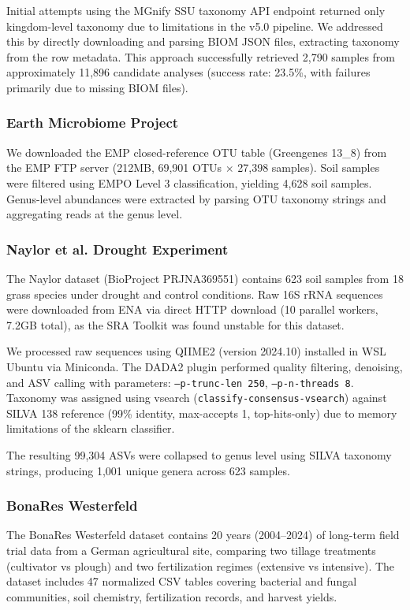 \documentclass[11pt,a4paper]{article}
\begin{document}
Initial attempts using the MGnify SSU taxonomy API endpoint returned only kingdom-level taxonomy due to limitations in the v5.0 pipeline. We addressed this by directly downloading and parsing BIOM JSON files, extracting taxonomy from the row metadata. This approach successfully retrieved 2,790 samples from approximately 11,896 candidate analyses (success rate: 23.5\%, with failures primarily due to missing BIOM files).

\subsubsection{Earth Microbiome Project}

We downloaded the EMP closed-reference OTU table (Greengenes 13\_8) from the EMP FTP server (212MB, 69,901 OTUs $\times$ 27,398 samples). Soil samples were filtered using EMPO Level 3 classification, yielding 4,628 soil samples. Genus-level abundances were extracted by parsing OTU taxonomy strings and aggregating reads at the genus level.

\subsubsection{Naylor et al. Drought Experiment}

The Naylor dataset (BioProject PRJNA369551) contains 623 soil samples from 18 grass species under drought and control conditions. Raw 16S rRNA sequences were downloaded from ENA via direct HTTP download (10 parallel workers, 7.2GB total), as the SRA Toolkit was found unstable for this dataset.

We processed raw sequences using QIIME2 (version 2024.10) installed in WSL Ubuntu via Miniconda. The DADA2 plugin performed quality filtering, denoising, and ASV calling with parameters: \texttt{--p-trunc-len 250}, \texttt{--p-n-threads 8}. Taxonomy was assigned using vsearch (\texttt{classify-consensus-vsearch}) against SILVA 138 reference (99\% identity, max-accepts 1, top-hits-only) due to memory limitations of the sklearn classifier.

The resulting 99,304 ASVs were collapsed to genus level using SILVA taxonomy strings, producing 1,001 unique genera across 623 samples.

\subsubsection{BonaRes Westerfeld}

The BonaRes Westerfeld dataset contains 20 years (2004--2024) of long-term field trial data from a German agricultural site, comparing two tillage treatments (cultivator vs plough) and two fertilization regimes (extensive vs intensive). The dataset includes 47 normalized CSV tables covering bacterial and fungal communities, soil chemistry, fertilization records, and harvest yields.
\end{document}
